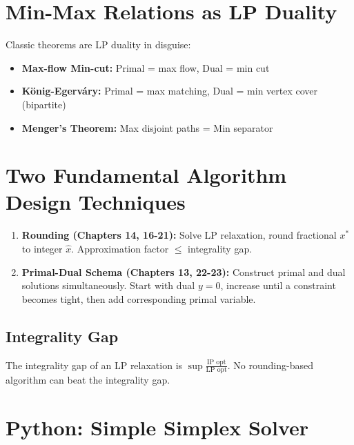 \documentclass[11pt,oneside]{book}
\begin{document}
\section{Min-Max Relations as LP Duality}

Classic theorems are LP duality in disguise:
\begin{itemize}
    \item \textbf{Max-flow Min-cut:} Primal = max flow, Dual = min cut
    \item \textbf{König-Egerváry:} Primal = max matching, Dual = min vertex cover (bipartite)
    \item \textbf{Menger's Theorem:} Max disjoint paths = Min separator
\end{itemize}

\section{Two Fundamental Algorithm Design Techniques}

\begin{enumerate}
    \item \textbf{Rounding (Chapters 14, 16-21):} Solve LP relaxation, round fractional $x^*$ to integer $\hat{x}$. Approximation factor $\leq$ integrality gap.
    \item \textbf{Primal-Dual Schema (Chapters 13, 22-23):} Construct primal and dual solutions simultaneously. Start with dual $y=0$, increase until a constraint becomes tight, then add corresponding primal variable.
\end{enumerate}

\subsection{Integrality Gap}

The integrality gap of an LP relaxation is $\sup \frac{\text{IP opt}}{\text{LP opt}}$. No rounding-based algorithm can beat the integrality gap.

\section{Python: Simple Simplex Solver}
\end{document}

